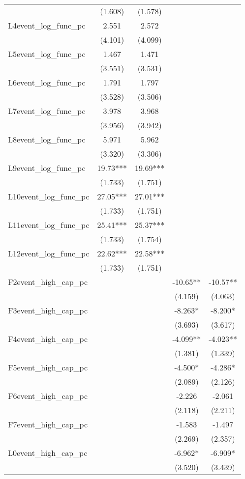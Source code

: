 \documentclass[]{article}
\begin{document}
\begin{tabular}{lcccc}
 & (1.608) & (1.578) &  &  \\
L4event\_log\_func\_pc & 2.551 & 2.572 &  &  \\
 & (4.101) & (4.099) &  &  \\
L5event\_log\_func\_pc & 1.467 & 1.471 &  &  \\
 & (3.551) & (3.531) &  &  \\
L6event\_log\_func\_pc & 1.791 & 1.797 &  &  \\
 & (3.528) & (3.506) &  &  \\
L7event\_log\_func\_pc & 3.978 & 3.968 &  &  \\
 & (3.956) & (3.942) &  &  \\
L8event\_log\_func\_pc & 5.971 & 5.962 &  &  \\
 & (3.320) & (3.306) &  &  \\
L9event\_log\_func\_pc & 19.73*** & 19.69*** &  &  \\
 & (1.733) & (1.751) &  &  \\
L10event\_log\_func\_pc & 27.05*** & 27.01*** &  &  \\
 & (1.733) & (1.751) &  &  \\
L11event\_log\_func\_pc & 25.41*** & 25.37*** &  &  \\
 & (1.733) & (1.754) &  &  \\
L12event\_log\_func\_pc & 22.62*** & 22.58*** &  &  \\
 & (1.733) & (1.751) &  &  \\
F2event\_high\_cap\_pc &  &  & -10.65** & -10.57** \\
 &  &  & (4.159) & (4.063) \\
F3event\_high\_cap\_pc &  &  & -8.263* & -8.200* \\
 &  &  & (3.693) & (3.617) \\
F4event\_high\_cap\_pc &  &  & -4.099** & -4.023** \\
 &  &  & (1.381) & (1.339) \\
F5event\_high\_cap\_pc &  &  & -4.500* & -4.286* \\
 &  &  & (2.089) & (2.126) \\
F6event\_high\_cap\_pc &  &  & -2.226 & -2.061 \\
 &  &  & (2.118) & (2.211) \\
F7event\_high\_cap\_pc &  &  & -1.583 & -1.497 \\
 &  &  & (2.269) & (2.357) \\
L0event\_high\_cap\_pc &  &  & -6.962* & -6.909* \\
 &  &  & (3.520) & (3.439) \\

\end{tabular}
\end{document}
